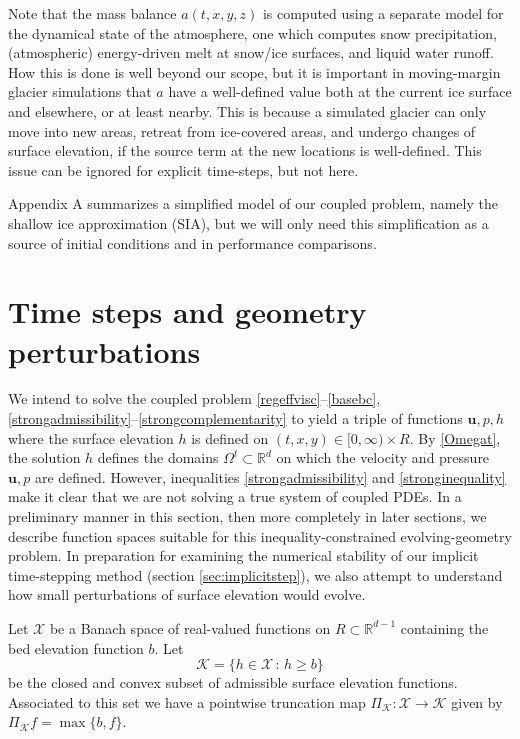 \documentclass[letterpaper,final,12pt,reqno]{amsart}
\newcommand{\RR}{\mathbb{R}}
\newcommand{\bu}{\mathbf{u}}
\begin{document}
Note that the mass balance $a(t,x,y,z)$ is computed using a separate model for the dynamical state of the atmosphere, one which computes snow precipitation, (atmospheric) energy-driven melt at snow/ice surfaces, and liquid water runoff.  How this is done is well beyond our scope, but it is important in moving-margin glacier simulations that $a$ have a well-defined value both at the current ice surface and elsewhere, or at least nearby.  This is because a simulated glacier can only move into new areas, retreat from ice-covered areas, and undergo changes of surface elevation, if the source term at the new locations is well-defined.  This issue can be ignored for explicit time-steps, but not here.

Appendix A summarizes a simplified model of our coupled problem, namely the shallow ice approximation (SIA), but we will only need this simplification as a source of initial conditions and in performance comparisons.


\section{Time steps and geometry perturbations} \label{sec:perturb}

We intend to solve the coupled problem \eqref{regeffvisc}--\eqref{basebc}, \eqref{strongadmissibility}--\eqref{strongcomplementarity} to yield a triple of functions $\bu,p,h$ where the surface elevation $h$ is defined on $(t,x,y) \in [0,\infty)\times R$.  By \eqref{Omegat}, the solution $h$ defines the domains $\Omega^t\subset \RR^d$ on which the velocity and pressure $\bu,p$ are defined.  However, inequalities \eqref{strongadmissibility} and \eqref{stronginequality} make it clear that we are not solving a true system of coupled PDEs.  In a preliminary manner in this section, then more completely in later sections, we describe function spaces suitable for this inequality-constrained evolving-geometry problem.  In preparation for examining the numerical stability of our implicit time-stepping method (section \ref{sec:implicitstep}), we also attempt to understand how small perturbations of surface elevation would evolve.

\newcommand{\PiK}{\Pi_{\mathcal{K}}}

Let $\mathcal{X}$ be a Banach space of real-valued functions on $R \subset \RR^{d-1}$ containing the bed elevation function $b$.  Let
    $$\mathcal{K} = \{h \in \mathcal{X}\,:\,h \ge b\}$$
be the closed and convex subset of admissible surface elevation functions.  Associated to this set we have a pointwise truncation map $\PiK : \mathcal{X} \to \mathcal{K}$ given by $\PiK f = \max\{b,f\}$.
\end{document}
